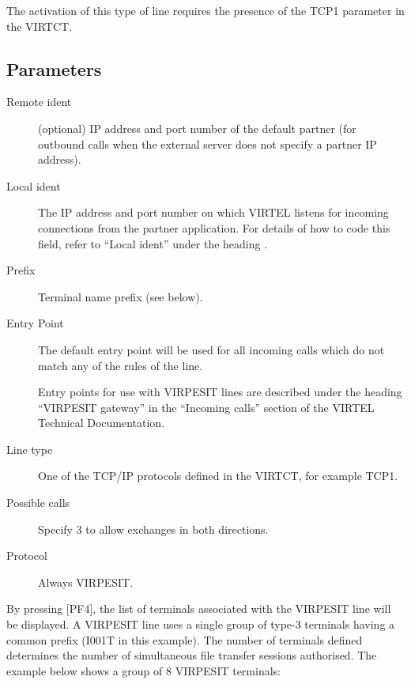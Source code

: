 \documentclass[letterpaper,10pt,english]{sphinxmanual}
\begin{document}
The activation of this type of line requires the presence of the TCP1 parameter in the VIRTCT.



\subsection{Parameters}
\label{\detokenize{connectivity_guide:index-56}}\label{\detokenize{connectivity_guide:id24}}\begin{description}
\item[{Remote ident}] \leavevmode
(optional) IP address and port number of the default partner (for outbound calls when the external server does not specify a partner IP address).

\item[{Local ident}] \leavevmode
The IP address and port number on which VIRTEL listens for incoming connections from the partner application. For details of how to code this field, refer to “Local ident” under the heading {\hyperref[\detokenize{connectivity_guide:bookmark13}]{}}.

\item[{Prefix}] \leavevmode
Terminal name prefix (see below).

\item[{Entry Point}] \leavevmode
The default entry point will be used for all incoming calls which do not match any of the rules of the line.

Entry points for use with VIRPESIT lines are described under the heading “VIRPESIT gateway” in the “Incoming calls” section of the VIRTEL Technical Documentation.

\item[{Line type}] \leavevmode
One of the TCP/IP protocols defined in the VIRTCT, for example TCP1.

\item[{Possible calls}] \leavevmode
Specify 3 to allow exchanges in both directions.

\item[{Protocol}] \leavevmode
Always VIRPESIT.

\end{description}

By pressing {[}PF4{]}, the list of terminals associated with the VIRPESIT line will be displayed. A VIRPESIT line uses a single group of type-3 terminals having a common prefix (I001T in this example). The number of terminals defined determines the number of simultaneous file transfer sessions authorised. The example below shows a group of 8 VIRPESIT terminals:
\end{document}
